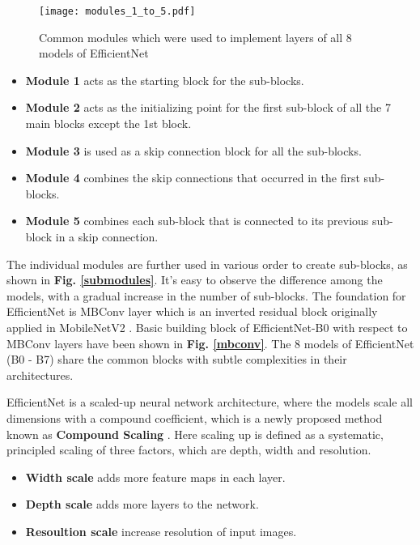 \documentclass[conference]{IEEEtran}
\begin{document}
\begin{figure}[h!]
    \centering
    \texttt{[image: modules\_1\_to\_5.pdf]}
    \caption{Common modules which were used to implement layers of all 8 models of EfficientNet}
    \label{Common_blocks}
\end{figure}

\begin{itemize}
    \item \textbf{Module 1} acts as the starting block for the sub-blocks.
    \item \textbf{Module 2} acts as the initializing point for the first sub-block of all the 7 main blocks except the 1st block.
    \item \textbf{Module 3} is used as a skip connection block for all the sub-blocks.
    \item \textbf{Module 4} combines the skip connections that occurred in the first sub-blocks.
    \item \textbf{Module 5} combines each sub-block that is connected to its previous sub-block in a skip connection.
\end{itemize}

The individual modules are further used in various order to create sub-blocks, as shown in \textbf{Fig. \ref{submodules}}. It’s easy to observe the difference among the models, with a gradual increase in the number of sub-blocks. The foundation for EfficientNet is MBConv layer which is an inverted residual block originally applied in MobileNetV2 \cite{sandler2018mobilenetv2}. Basic building block of EfficientNet-B0 with respect to MBConv layers have been shown in \textbf{Fig. \ref{mbconv}}. The 8 models of EfficientNet (B0 - B7) share the common blocks with subtle complexities in their architectures. 

EfficientNet is a scaled-up neural network architecture, where the models scale all dimensions with a compound coefficient, which is a newly proposed method known as \textbf{Compound Scaling} \cite{lee2020compounding}. Here scaling up is defined as a systematic, principled scaling of three factors, which are depth, width and resolution.

\begin{samepage}
\begin{itemize}
    \item \textbf{Width scale} adds more feature maps in each layer.
    \item \textbf{Depth scale} adds more layers to the network.
    \item \textbf{Resoultion scale} increase resolution of input images.
\end{itemize}
\end{samepage}
\end{document}
